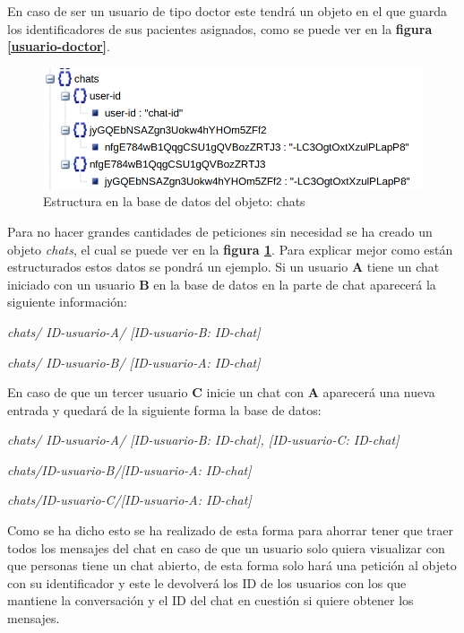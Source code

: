 En caso de ser un usuario de tipo doctor este tendrá un objeto en el que
guarda los identificadores de sus pacientes asignados, como se puede ver
en la \textbf{figura \ref{usuario-doctor}}.

\medskip
\begin{figure}
    \includegraphics[width=\linewidth]{./images/database/chats-database.png}
    \caption{Estructura en la base de datos del objeto: chats}
    \label{chat}
\end{figure}

Para no hacer grandes cantidades de peticiones sin necesidad
se ha creado un objeto \textit{chats}, el cual se puede ver en la
\textbf{figura \ref{chat}}. Para explicar mejor como están estructurados
estos datos se pondrá un ejemplo. Si un usuario \textbf{A} tiene un chat
iniciado con un usuario \textbf{B} en la base de datos en la parte de chat
aparecerá la siguiente información:

\smallskip
\textit{chats/ ID-usuario-A/ [ID-usuario-B: ID-chat]}

\smallskip
\textit{chats/ ID-usuario-B/ [ID-usuario-A: ID-chat]}

\smallskip
En caso de que un tercer usuario \textbf{C} inicie un chat con \textbf{A}
aparecerá una nueva entrada y quedará de la siguiente forma la base de datos:

\smallskip
\textit{chats/ ID-usuario-A/ [ID-usuario-B: ID-chat], [ID-usuario-C: ID-chat]}

\smallskip
\textit{chats/ID-usuario-B/[ID-usuario-A: ID-chat]}

\smallskip
\textit{chats/ID-usuario-C/[ID-usuario-A: ID-chat]}

\smallskip
Como se ha dicho esto se ha realizado de esta forma para ahorrar
tener que traer todos los
mensajes del chat en caso de que un usuario solo quiera visualizar con
que personas tiene un chat abierto, de esta forma solo hará una petición
al objeto con su identificador y este le devolverá los ID de los usuarios
con los que mantiene la conversación y el ID del chat en cuestión si quiere
obtener los mensajes.


